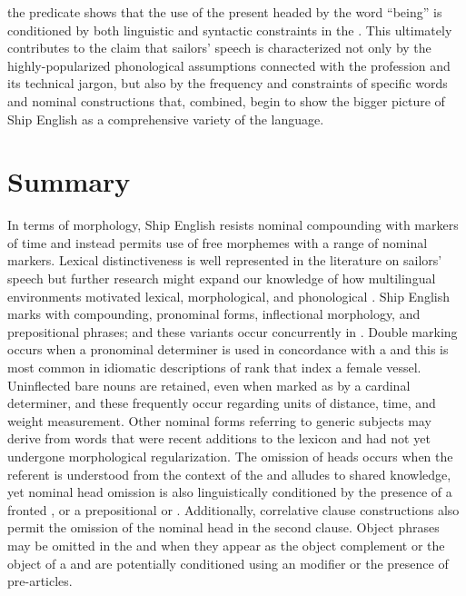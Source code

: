 the predicate shows that the use of the present  headed by the word “being” is conditioned by both linguistic and syntactic constraints in the . This ultimately contributes to the claim that sailors’ speech is characterized not only by the highly-popularized phonological assumptions connected with the profession and its technical jargon, but also by the frequency and constraints of specific words and nominal constructions that, combined, begin to show the bigger picture of Ship English as a comprehensive variety of the language.  

\section{{Summary} }\label{sec:5.6}

In terms of morphology, Ship English resists nominal compounding with markers of time and instead permits use of free morphemes with a range of nominal markers. Lexical distinctiveness is well represented in the literature on sailors’ speech but further research might expand our knowledge of how multilingual environments motivated lexical, morphological, and phonological . Ship English marks  with  compounding,  pronominal forms, inflectional morphology, and prepositional phrases; and these variants occur concurrently in . Double  marking occurs when a pronominal  determiner is used in concordance with a  and this is most common in idiomatic descriptions of rank that index a female vessel. Uninflected bare nouns are retained, even when marked as  by a cardinal determiner, and these frequently occur regarding units of distance, time, and weight measurement. Other  nominal forms referring to generic subjects may derive from words that were recent additions to the lexicon and had not yet undergone morphological regularization. The omission of  heads occurs when the referent is understood from the context of the  and alludes to shared knowledge, yet nominal head omission is also linguistically conditioned by the presence of a fronted , or a prepositional or . Additionally, correlative clause constructions also permit the omission of the nominal head in the second clause. Object  phrases may be omitted in the  and when they appear as the object complement or the object of a  and are potentially conditioned using an  modifier or the presence of pre-articles.

